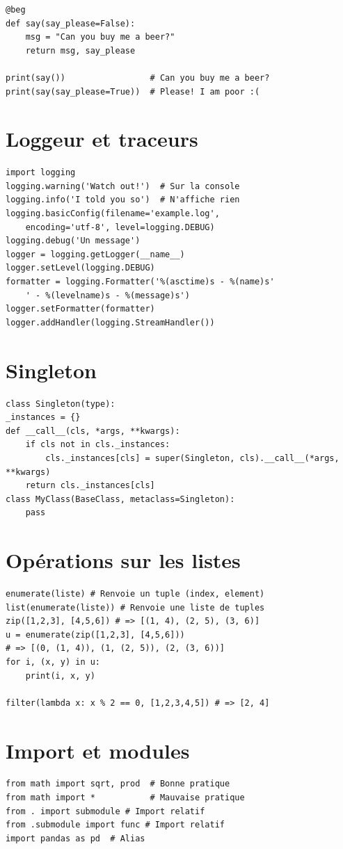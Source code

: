 \documentclass{article}
\begin{document}
\begin{multicols*}{4}
\begin{lstlisting}
@beg
def say(say_please=False):
    msg = "Can you buy me a beer?"
    return msg, say_please

print(say())                 # Can you buy me a beer?
print(say(say_please=True))  # Please! I am poor :(
\end{lstlisting}

\section*{Loggeur et traceurs}
\begin{lstlisting}
import logging
logging.warning('Watch out!')  # Sur la console
logging.info('I told you so')  # N'affiche rien
logging.basicConfig(filename='example.log',
    encoding='utf-8', level=logging.DEBUG)
logging.debug('Un message')
logger = logging.getLogger(__name__)
logger.setLevel(logging.DEBUG)
formatter = logging.Formatter('%(asctime)s - %(name)s'
    ' - %(levelname)s - %(message)s')
logger.setFormatter(formatter)
logger.addHandler(logging.StreamHandler())
\end{lstlisting}

\section*{Singleton}
\begin{lstlisting}
class Singleton(type):
_instances = {}
def __call__(cls, *args, **kwargs):
    if cls not in cls._instances:
        cls._instances[cls] = super(Singleton, cls).__call__(*args, **kwargs)
    return cls._instances[cls]
class MyClass(BaseClass, metaclass=Singleton):
    pass
\end{lstlisting}

\section*{Opérations sur les listes}
\begin{lstlisting}
enumerate(liste) # Renvoie un tuple (index, element)
list(enumerate(liste)) # Renvoie une liste de tuples
zip([1,2,3], [4,5,6]) # => [(1, 4), (2, 5), (3, 6)]
u = enumerate(zip([1,2,3], [4,5,6]))
# => [(0, (1, 4)), (1, (2, 5)), (2, (3, 6))]
for i, (x, y) in u:
    print(i, x, y)

filter(lambda x: x % 2 == 0, [1,2,3,4,5]) # => [2, 4]
\end{lstlisting}

\section*{Import et modules}
\begin{lstlisting}
from math import sqrt, prod  # Bonne pratique
from math import *           # Mauvaise pratique
from . import submodule # Import relatif
from .submodule import func # Import relatif
import pandas as pd  # Alias


\end{lstlisting}
\end{multicols*}
\end{document}
